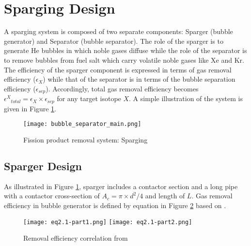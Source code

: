 \section{Sparging Design}

    A sparging system is composed of two separate components: Sparger (bubble 
    generator) and Separator (bubble separator). The role of the sparger is to 
    generate He bubbles in which noble gases diffuse while the role of the 
    separator is to remove bubbles from fuel salt which carry volatile noble 
    gases like Xe and Kr. The efficiency of the sparger component is expressed 
    in terms of gas removal efficiency ($\epsilon_{X}$) while that of the 
    separator is in terms of the bubble separation efficiency 
    ($\epsilon_{sep}$). Accordingly, total gas removal efficiency becomes 
    ${\epsilon^{X}}_{total} = \epsilon_{X} \times \epsilon_{sep}$ for any 
    target isotope $X$. A simple illustration of the system is given in Figure 
    \ref{fig:sparging}.

    \begin{figure}[htbp!]
        \begin{center}
            \texttt{[image: bubble\_separator\_main.png]}
        \end{center}
        \caption{Fission product removal system: Sparging}
        \label{fig:sparging}
    \end{figure}

\subsection{Sparger Design}

 As illustrated in Figure \ref{fig:sparging}, sparger includes a contactor 
 section and a long pipe with a contactor cross-section of $A_c = \pi\times 
 d^2/4$ and length of $L$. Gas removal efficiency in bubble generator is 
 defined by equation in Figure \ref{fig:eq2} based on 
 \cite{peebles_removal_1968}.

    \begin{figure}[h!]
        \begin{center}
            \texttt{[image: eq2.1-part1.png]}
            \texttt{[image: eq2.1-part2.png]}
        \end{center}
        \caption{Removal efficiency correlation from 
            \cite{peebles_removal_1968}}
        \label{fig:eq2}
    \end{figure}

